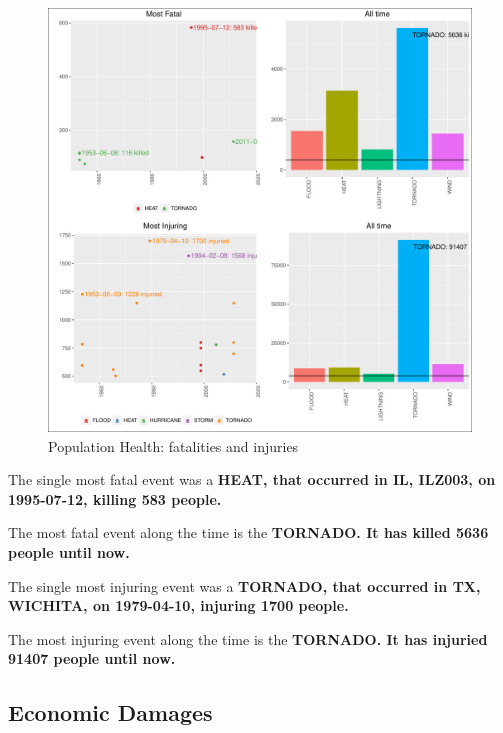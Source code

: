 \documentclass[]{article}
\begin{document}
\begin{figure}[htbp]
\centering
\includegraphics{readme_files/figure-latex/health-plot-1.pdf}
\caption{Population Health: fatalities and injuries}
\end{figure}

The single most fatal event was a \textbf{HEAT, that occurred in IL,
ILZ003, on 1995-07-12, killing 583 people.}

The most fatal event along the time is the \textbf{TORNADO. It has
killed 5636 people until now.}

The single most injuring event was a \textbf{TORNADO, that occurred in
TX, WICHITA, on 1979-04-10, injuring 1700 people.}

The most injuring event along the time is the \textbf{TORNADO. It has
injuried 91407 people until now.}

\subsection{Economic Damages}\label{economic-damages}
\end{document}
